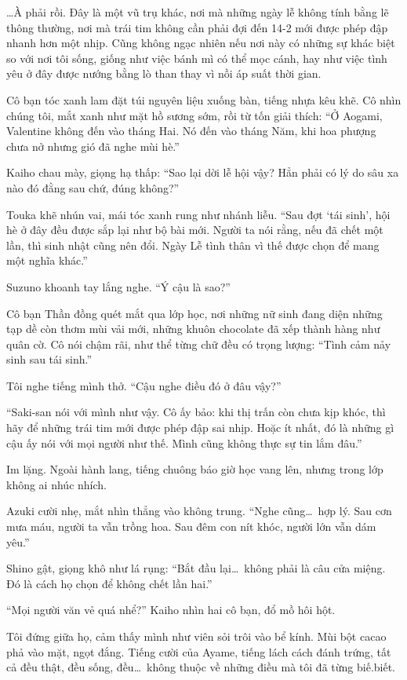 \documentclass[../main.tex]{subfiles}
\begin{document}
\dots À phải rồi. Đây là một vũ trụ khác, nơi mà những ngày lễ không tính bằng lẽ thông thường, nơi mà trái tim không cần phải đợi đến 14-2 mới được phép đập nhanh hơn một nhịp. Cũng không ngạc nhiên nếu nơi này có những sự khác biệt so với nơi tôi sống, giống như việc bánh mì có thể mọc cánh, hay như việc tình yêu ở đây được nướng bằng lò than thay vì nồi áp suất thời gian.

Cô bạn tóc xanh lam đặt túi nguyên liệu xuống bàn, tiếng nhựa kêu khẽ.  Cô nhìn chúng tôi, mắt xanh như mặt hồ sương sớm, rồi từ tốn giải thích: ``Ở Aogami, Valentine không đến vào tháng Hai. Nó đến vào tháng Năm, khi hoa phượng chưa nở nhưng gió đã nghe mùi hè.''

Kaiho chau mày, giọng hạ thấp: ``Sao lại dời lễ hội vậy? Hẳn phải có lý do sâu xa nào đó đằng sau chứ, đúng không?''

Touka khẽ nhún vai, mái tóc xanh rung như nhánh liễu. ``Sau đợt `tái sinh', hội hè ở đây đều được sắp lại như bộ bài mới. Người ta nói rằng, nếu đã chết một lần, thì sinh nhật cũng nên đổi.  Ngày Lễ tình thân vì thế được chọn để mang một nghĩa khác.''

Suzuno khoanh tay lắng nghe. ``Ý cậu là sao?''

Cô bạn Thần đồng quét mắt qua lớp học, nơi những nữ sinh đang diện những tạp dề còn thơm mùi vải mới, những khuôn chocolate đã xếp thành hàng như quân cờ. Cô nói chậm rãi, như thể từng chữ đều có trọng lượng: ``Tình cảm nảy sinh sau tái sinh.''

Tôi nghe tiếng mình thở. ``Cậu nghe điều đó ở đâu vậy?''

``Saki-san nói với mình như vậy. Cô ấy bảo: khi thị trấn còn chưa kịp khóc, thì hãy để những trái tim mới được phép đập sai nhịp. Hoặc ít nhất, đó là những gì cậu ấy nói với mọi người như thế. Mình cũng không thực sự tin lắm đâu.''

Im lặng. Ngoài hành lang, tiếng chuông báo giờ học vang lên, nhưng trong lớp không ai nhúc nhích.

Azuki cười nhẹ, mắt nhìn thẳng vào không trung. ``Nghe cũng\dots\ hợp lý. Sau cơn mưa máu, người ta vẫn trồng hoa. Sau đêm con nít khóc, người lớn vẫn dám yêu.''

Shino gật, giọng khô như lá rụng: ``Bắt đầu lại\dots\ không phải là câu cửa miệng. Đó là cách họ chọn để không chết lần hai.''

``Mọi người văn vẻ quá nhể?'' Kaiho nhìn hai cô bạn, đổ mồ hôi hột.

Tôi đứng giữa họ, cảm thấy mình như viên sỏi trôi vào bể kính. Mùi bột cacao phả vào mặt, ngọt đắng. Tiếng cười của Ayame, tiếng lách cách đánh trứng, tất cả đều thật, đều sống, đều\dots\ không thuộc về những điều mà tôi đã từng biế.biết.
\end{document}
